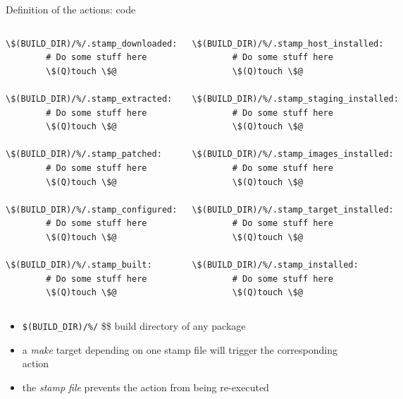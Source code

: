 \begin{frame}[fragile]{Definition of the actions: code}
  \begin{columns}
    \begin{block}{}
    \begin{verbatim}
\$(BUILD_DIR)/%/.stamp_downloaded:
        # Do some stuff here
        \$(Q)touch \$@

\$(BUILD_DIR)/%/.stamp_extracted:
        # Do some stuff here
        \$(Q)touch \$@

\$(BUILD_DIR)/%/.stamp_patched:
        # Do some stuff here
        \$(Q)touch \$@

\$(BUILD_DIR)/%/.stamp_configured:
        # Do some stuff here
        \$(Q)touch \$@

\$(BUILD_DIR)/%/.stamp_built:
        # Do some stuff here
        \$(Q)touch \$@
      \end{verbatim}
      \end{block}
      \begin{block}{}
      \begin{verbatim}
\$(BUILD_DIR)/%/.stamp_host_installed:
        # Do some stuff here
        \$(Q)touch \$@

\$(BUILD_DIR)/%/.stamp_staging_installed:
        # Do some stuff here
        \$(Q)touch \$@

\$(BUILD_DIR)/%/.stamp_images_installed:
        # Do some stuff here
        \$(Q)touch \$@

\$(BUILD_DIR)/%/.stamp_target_installed:
        # Do some stuff here
        \$(Q)touch \$@

\$(BUILD_DIR)/%/.stamp_installed:
        # Do some stuff here
        \$(Q)touch \$@
    \end{verbatim}
  \end{block}
 \end{columns}

 \begin{itemize}
 \item {\tt \$(BUILD\_DIR)/\%/} \$\rightarrow\$ build directory of any package
 \item a {\em make} target depending on one stamp file will trigger
   the corresponding action
 \item the {\em stamp file} prevents the action from being re-executed
 \end{itemize}

\end{frame}

